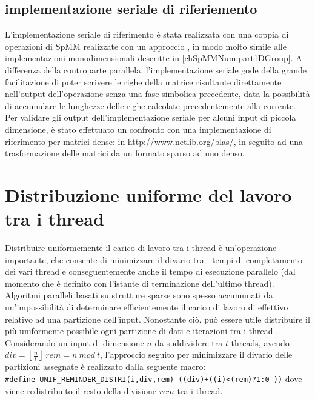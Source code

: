 \subsection{implementazione seriale di riferiemento}	\label{implSerialeRiferimento}
L'implementazione seriale di riferimento è stata realizzata con una coppia di operazioni di SpMM
realizzate con un approccio \rowbyrow, in modo molto simile alle implementazioni monodimensionali descritte in \ref{chSpMMNum:part1DGroup}.
A differenza della controparte parallela, l'implementazione seriale gode della grande facilitazione 
di poter scrivere le righe della matrice risultante direttamente nell'output dell'operazione senza una fase simbolica precedente,
data la possibilità di accumulare le lunghezze delle righe calcolate precedentemente alla corrente.\\
\voidLine
Per validare gli output dell'implementazione seriale per alcuni input di piccola dimensione,
è stato effettuato un confronto con una implementazione di riferimento per matrici dense:  in \url{http://www.netlib.org/blas/},
in seguito ad una trasformazione delle matrici da un formato sparso ad uno denso.\\

\section{Distribuzione uniforme del lavoro tra i thread}	\label{chSpMMAux:UNIF_REMINDER_DISTRI}
Distribuire uniformemente il carico di lavoro tra i thread è un'operazione importante,
che consente di minimizzare il divario tra i tempi di completamento dei vari thread 
e conseguentemente anche il tempo di esecuzione parallelo
(dal momento che è definito con l'istante di terminazione dell'ultimo thread).\\

Algoritmi paralleli basati su strutture sparse sono spesso accumunati da 
un'impossibilità di determinare efficientemente il carico di lavoro di effettivo
relativo ad una partizione dell'input.
Nonostante ciò, può essere utile distribuire il più uniformente possibile ogni partizione 
di dati e iterazioni tra i thread .\\%
Considerando un input di dimensione $n$ da suddividere tra $t$ threads, avendo\\
$div=\left\lfloor \frac{n}{t}  \right\rfloor ~ rem=n ~mod ~t$,
l'approccio seguito per minimizzare il divario delle partizioni assegnate %
è realizzato dalla seguente macro:\\
\verb|#define UNIF_REMINDER_DISTRI(i,div,rem) ((div)+((i)<(rem)?1:0 ))|
dove viene redistribuito il resto della divisione $rem$ tra i thread.\\
